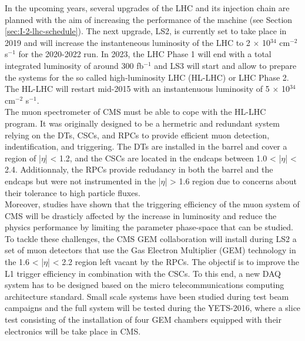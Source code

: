 In the upcoming years, several upgrades of the LHC and its injection chain are planned with the aim of increasing the performance of the machine (see Section \ref{sec:I-2-lhc-schedule}). The next upgrade, LS2, is currently set to take place in 2019 and will increase the instanteneous luminosity of the LHC to 2 $ \times $ 10$^{34}$ cm$^{-2}$ s$^{-1}$ for the 2020-2022 run. In 2023, the LHC Phase 1 will end with a total integrated luminosity of around 300 fb$^{-1}$ and LS3 will start and allow to prepare the systems for the so called high-luminosity LHC (HL-LHC) or LHC Phase 2. The HL-LHC will restart mid-2015 with an instantenuous luminosity of 5 $ \times $ 10$^{34}$ cm$^{-2}$ s$^{-1}$. \\

The muon spectrometer of CMS must be able to cope with the HL-LHC program. It was originally designed to be a hermetric and redundant system relying on the DTs, CSCs, and RPCs to provide efficient muon detection, indentification, and triggering. The DTs are installed in the barrel and cover a region of |$\eta$| < 1.2, and the CSCs are located in the endcaps between 1.0 < |$\eta$| < 2.4. Additionnaly, the RPCs provide redudancy in both the barrel and the endcaps but were not instrumented in the |$\eta$| > 1.6 region due to concerns about their tolerance to high particle fluxes. \\

Moreover, studies have shown that the triggering efficiency of the muon system of CMS will be drasticly affected by the increase in luminosity and reduce the physics performance by limiting the parameter phase-space that can be studied. \\

To tackle these challenges, the CMS GEM collaboration \cite{Colaleo:2021453} will install during LS2 a set of muon detectors that use the Gas Electron Multiplier (GEM) technology in the 1.6 < |$\eta$| < 2.2 region left vacant by the RPCs. The objectif is to improve the L1 trigger efficiency in combination with the CSCs. To this end, a new DAQ system has to be designed based on the micro telecommunications computing architecture standard. Small scale systems have been studied during test beam campaigns and the full system will be tested during the YETS-2016, where a slice test consisting of the installation of four GEM chambers equipped with their electronics will be take place in CMS. \\

